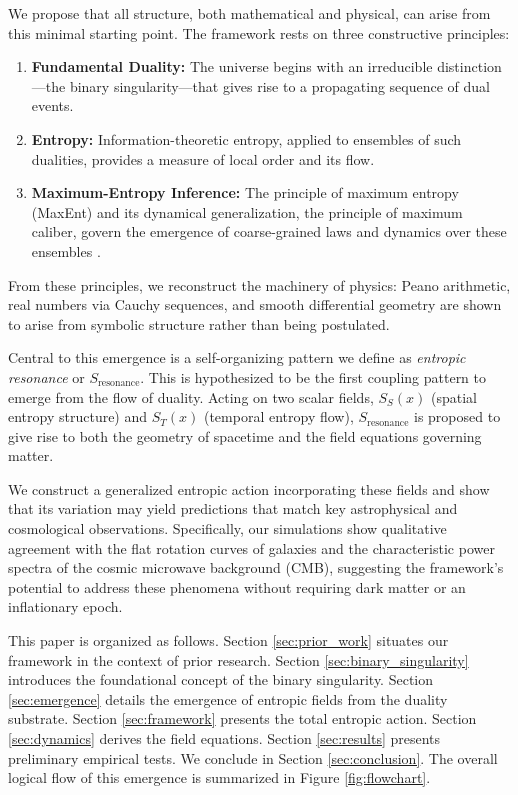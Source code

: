 \documentclass[12pt, a4paper]{article}
\begin{document}
We propose that all structure, both mathematical and physical, can arise from this minimal starting point. The framework rests on three constructive principles:
\begin{enumerate}
    \item \textbf{Fundamental Duality:} The universe begins with an irreducible distinction—the binary singularity—that gives rise to a propagating sequence of dual events.
    \item \textbf{Entropy:} Information-theoretic entropy, applied to ensembles of such dualities, provides a measure of local order and its flow.
    \item \textbf{Maximum-Entropy Inference:} The principle of maximum entropy (MaxEnt) and its dynamical generalization, the principle of maximum caliber, govern the emergence of coarse-grained laws and dynamics over these ensembles \cite{Jaynes1957, Caticha2012}.
\end{enumerate}

From these principles, we reconstruct the machinery of physics: Peano arithmetic, real numbers via Cauchy sequences, and smooth differential geometry are shown to arise from symbolic structure rather than being postulated.

Central to this emergence is a self-organizing pattern we define as \emph{entropic resonance} or \(S_{\mathrm{resonance}}\). This is hypothesized to be the first coupling pattern to emerge from the flow of duality. Acting on two scalar fields, \(S_S(x)\) (spatial entropy structure) and \(S_T(x)\) (temporal entropy flow), \(S_{\mathrm{resonance}}\) is proposed to give rise to both the geometry of spacetime and the field equations governing matter.

We construct a generalized entropic action incorporating these fields and show that its variation may yield predictions that match key astrophysical and cosmological observations. Specifically, our simulations show qualitative agreement with the flat rotation curves of galaxies and the characteristic power spectra of the cosmic microwave background (CMB), suggesting the framework's potential to address these phenomena without requiring dark matter or an inflationary epoch.

This paper is organized as follows. Section \ref{sec:prior_work} situates our framework in the context of prior research. Section \ref{sec:binary_singularity} introduces the foundational concept of the binary singularity. Section \ref{sec:emergence} details the emergence of entropic fields from the duality substrate. Section \ref{sec:framework} presents the total entropic action. Section \ref{sec:dynamics} derives the field equations. Section \ref{sec:results} presents preliminary empirical tests. We conclude in Section \ref{sec:conclusion}. The overall logical flow of this emergence is summarized in Figure \ref{fig:flowchart}.
\end{document}
